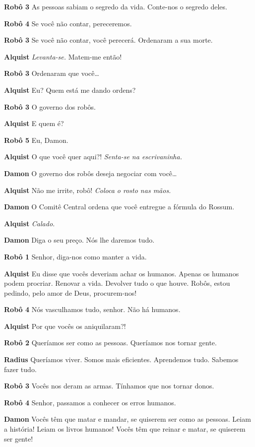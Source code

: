 \textbf{Robô 3} As pessoas sabiam o segredo da vida. Conte-nos o segredo deles.

\textbf{Robô 4} Se você não contar, pereceremos.

\textbf{Robô 3} Se você não contar, você perecerá. Ordenaram a sua morte.

\textbf{Alquist} \emph{Levanta-se.} Matem-me então!

\textbf{Robô 3} Ordenaram que você\ldots{}

\textbf{Alquist} Eu? Quem está me dando ordens?

\textbf{Robô 3} O governo dos robôs.

\textbf{Alquist} E quem é?

\textbf{Robô 5} Eu, Damon.

\textbf{Alquist} O que você quer aqui?! \emph{Senta-se na escrivaninha.}

\textbf{Damon} O governo dos robôs deseja negociar com você\ldots{}

\textbf{Alquist} Não me irrite, robô! \emph{Coloca o rosto nas mãos.}

\textbf{Damon} O Comitê Central ordena que você entregue a fórmula do Rossum.

\textbf{Alquist} \emph{Calado.}

\textbf{Damon} Diga o seu preço. Nós lhe daremos tudo.

\textbf{Robô 1} Senhor, diga-nos como manter a vida.

\textbf{Alquist} Eu disse que vocês deveriam achar os humanos. Apenas os
humanos podem procriar. Renovar a vida. Devolver tudo o que houve. Robôs, estou
pedindo, pelo amor de Deus, procurem-nos!

\textbf{Robô 4} Nós vasculhamos tudo, senhor. Não há humanos.

\textbf{Alquist} Por que vocês os aniquilaram?!

\textbf{Robô 2} Queríamos ser como as pessoas. Queríamos nos tornar gente.

\textbf{Radius} Queríamos viver. Somos mais eficientes. Aprendemos tudo. Sabemos fazer
tudo.

\textbf{Robô 3} Vocês nos deram as armas. Tínhamos que nos tornar donos.

\textbf{Robô 4} Senhor, passamos a conhecer os erros humanos.

\textbf{Damon} Vocês têm que matar e mandar, se quiserem ser como as pessoas. Leiam a
história! Leiam os livros humanos! Vocês têm que reinar e matar, se quiserem ser
gente!

